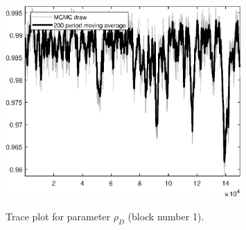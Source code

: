 \begin{figure}[H]
\centering
  \includegraphics[width=0.8\textwidth]{BRS_gen/graphs/TracePlot_rho_D_blck_1}\\
    \caption{Trace plot for parameter ${\rho_D}$ (block number 1).}
\end{figure}
